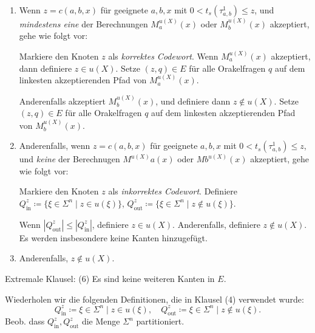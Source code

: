 \documentclass[nofonts]{uebung}
\begin{document}
\begin{enumerate}[label=(\arabic*),resume*]
\item Wenn $z=c(a,b,x)$ für geeignete $a,b,x$ mit $0<t_s(\tau^1_{a,b})\leq z$, und \emph{mindestens eine} der Berechnungen $M^{{u(X)}}_{a}(x)$ oder $M_{b}^{{u(X)}}(x)$ akzeptiert, gehe wie folgt vor:

Markiere den Knoten $z$ als \emph{korrektes Codewort}.
Wenn $M_a^{{u(X)}}(x)$ akzeptiert, dann definiere $z\in u(X)$.
Setze $(z,q)\in E$ für alle Orakelfragen $q$ auf dem linkesten akzeptierenden Pfad von $M_a^{u(X)}(x)$.

Anderenfalls akzeptiert $M_b^{{u(X)}}(x)$, und definiere dann $z\not\in u(X)$.
Setze $(z,q)\in E$ für alle Orakelfragen $q$ auf dem linkesten akzeptierenden Pfad von $M_b^{u(X)}(x)$.

\item Anderenfalls, wenn $z=c(a,b,x)$ für geeignete $a,b,x$ mit $0<t_s(\tau^1_{a,b})\leq z$, und \emph{keine} der Berechnugen $M^{{u(X)}}{a}(x)$ oder $M{b}^{{u(X)}}(x)$ akzeptiert, gehe wie folgt vor:

Markiere den Knoten $z$ als \emph{inkorrektes Codewort}.
Definiere $Q^z_\mathrm{in} \coloneqq \{ \xi\in\Sigma^n \mid z\in u({\xi}) \}$, $Q^z_\mathrm{out} \coloneqq \{ \xi\in\Sigma^n \mid z\not\in u({\xi})\}$.

Wenn $|Q^z_\mathrm{out}|\leq |Q^z_\mathrm{in}|$, definiere $z\in u(X)$.  Anderenfalls, definiere $z\not\in u(X)$.
Es werden insbesondere keine Kanten hinzugefügt.

\item Anderenfalls, $z\not\in u(X)$.
\end{enumerate}
Extremale Klausel: (6) Es sind keine weiteren Kanten in $E$.

Wiederholen wir die folgenden Definitionen, die in Klausel (4) verwendet wurde:  
\begin{equation*}
Q_\mathrm{in}^z\coloneqq {\xi\in\Sigma^n \mid z\in u({\xi})},\quad Q_\mathrm{out}^z\coloneqq {\xi\in\Sigma^n \mid z\not\in u({\xi})}.
\end{equation*}
Beob. dass  $Q_\mathrm{in}^z, Q_\mathrm{out}^z$ die Menge $\Sigma^n$ partitioniert.
\end{document}
